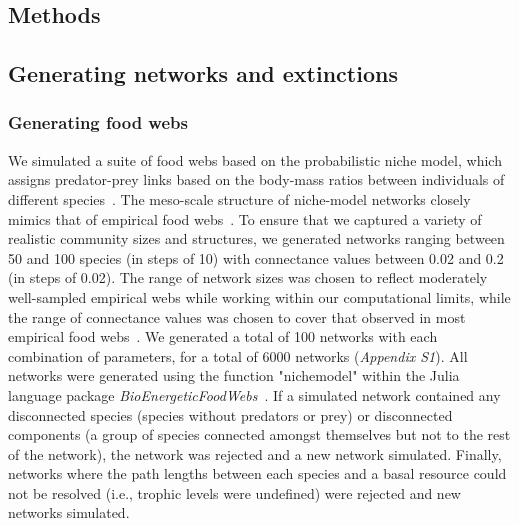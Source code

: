 \documentclass[12pt]{article}
\begin{document}
\begin{spacing}{2.0}
\section*{Methods}

    \subsection*{Generating networks and extinctions}

    	\subsubsection*{Generating food webs}
    
    		We simulated a suite of food webs based on the probabilistic niche model, which assigns predator-prey links based on the body-mass ratios between individuals of different species~\citep{Williams2000,Delmas2017}. The meso-scale structure of niche-model networks closely mimics that of empirical food webs~\citep{Stouffer2007}. To ensure that we captured a variety of realistic community sizes and structures, we generated networks ranging between 50 and 100 species (in steps of 10) with connectance values between 0.02 and 0.2 (in steps of 0.02). The range of network sizes was chosen to reflect moderately well-sampled empirical webs while working within our computational limits, while the range of connectance values was chosen to cover that observed in most empirical food webs~\citep{Dunne2002}. We generated a total of 100 networks with each combination of parameters, for a total of 6000 networks (\emph{Appendix S1}). All networks were generated using the function "nichemodel" within the Julia language package \emph{BioEnergeticFoodWebs}~\citep{bioenergeticfw,Delmas2017}. If a simulated network contained any disconnected species (species without predators or prey) or disconnected components (a group of species connected amongst themselves but not to the rest of the network), the network was rejected and a new network simulated. Finally, networks where the path lengths between each species and a basal resource could not be resolved (i.e., trophic levels were undefined) were rejected and new networks simulated.
    

\end{spacing}
\end{document}
